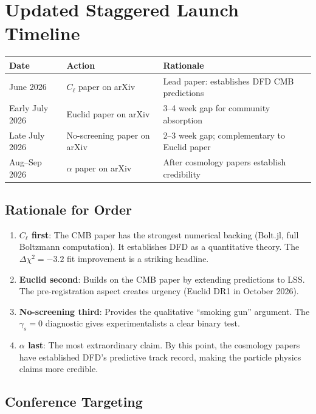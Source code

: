 \documentclass[11pt,a4paper]{article}
\begin{document}
\section{Updated Staggered Launch Timeline}

\begin{center}
\begin{tabular}{lll}
\toprule
\textbf{Date} & \textbf{Action} & \textbf{Rationale} \\
\midrule
June 2026 & $C_\ell$ paper on arXiv & Lead paper: establishes DFD CMB predictions \\
Early July 2026 & Euclid paper on arXiv & 3--4 week gap for community absorption \\
Late July 2026 & No-screening paper on arXiv & 2--3 week gap; complementary to Euclid paper \\
Aug--Sep 2026 & $\alpha$ paper on arXiv & After cosmology papers establish credibility \\
\bottomrule
\end{tabular}
\end{center}

\subsection{Rationale for Order}

\begin{enumerate}
\item \textbf{$C_\ell$ first}: The CMB paper has the strongest numerical backing (Bolt.jl, full Boltzmann computation). It establishes DFD as a quantitative theory. The $\Delta\chi^2 = -3.2$ fit improvement is a striking headline.
\item \textbf{Euclid second}: Builds on the CMB paper by extending predictions to LSS. The pre-registration aspect creates urgency (Euclid DR1 in October 2026).
\item \textbf{No-screening third}: Provides the qualitative ``smoking gun'' argument. The $\gamma_s = 0$ diagnostic gives experimentalists a clear binary test.
\item \textbf{$\alpha$ last}: The most extraordinary claim. By this point, the cosmology papers have established DFD's predictive track record, making the particle physics claims more credible.
\end{enumerate}

\subsection{Conference Targeting}
\end{document}
